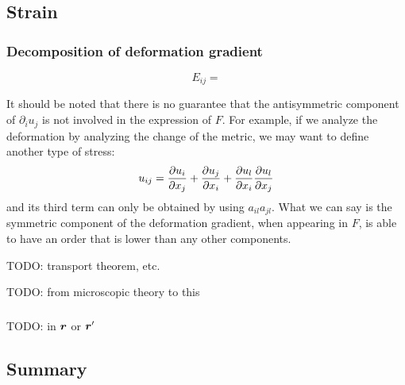 \documentclass[hyperref, a4paper]{article}
\begin{document}
\subsection{Strain}

\subsubsection{Decomposition of deformation gradient}

\begin{equation}
    E_{ij} =
\end{equation}

It should be noted that there is no guarantee 
that the antisymmetric component of $\partial_i u_j$ is not involved 
in the expression of $F$.
For example, if we analyze the deformation by 
analyzing the change of the metric,
we may want to define another type of stress: 
\begin{equation}
    u_{ij} = \pdv{u_i}{x_j} + \pdv{u_j}{x_i} + \pdv{u_l}{x_i} \pdv{u_l}{x_j}
\end{equation}
and its third term can only be obtained by using $a_{il} a_{jl}$.
What we can say is the symmetric component of the deformation gradient,
when appearing in $F$,
is able to have an order that is lower than 
any other components.

TODO: transport theorem, etc.

TODO: from microscopic theory to this

\subsubsection{}

TODO: in $\vb*{r}$ or $\vb*{r}'$

\subsection{Summary}
\end{document}
